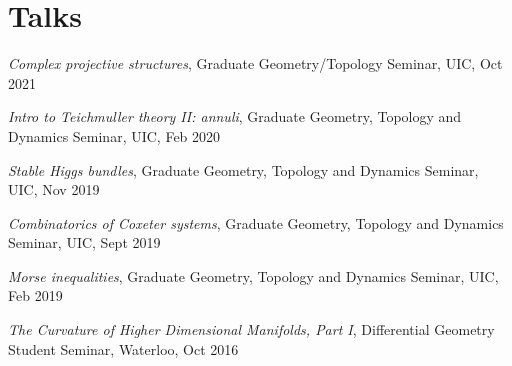 \documentclass[letterpaper]{article}
\makeatletter
\newcommand*{\sectionbookmark}[1][]{ 
  \bookmark[ 
    level=section, 
    dest=\@currentHref, 
    #1 
  ] 
}
\makeatother
\begin{document}
\section*{\sc Talks}
\sectionbookmark{Talks}

\begin{etaremune}
\item \emph{Complex projective structures}, Graduate Geometry/Topology Seminar, UIC, Oct 2021

  
\item \emph{Intro to Teichmuller theory II: annuli}, Graduate Geometry, Topology and Dynamics Seminar, UIC, Feb 2020
  
\item \emph{Stable Higgs bundles}, Graduate Geometry, Topology and Dynamics Seminar, UIC, Nov 2019
  
\item \emph{Combinatorics of Coxeter systems}, Graduate Geometry, Topology and Dynamics Seminar, UIC, Sept 2019


\item \emph{Morse inequalities}, Graduate Geometry, Topology and Dynamics Seminar, UIC, Feb 2019
  
  
\item \emph{The Curvature of Higher Dimensional Manifolds, Part I}, Differential Geometry Student Seminar, Waterloo, Oct 2016


\end{etaremune}
\end{document}
